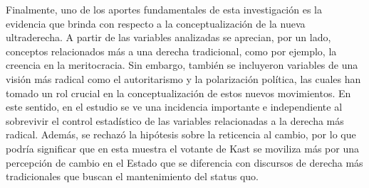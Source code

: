 \documentclass[
  spanish,
  a4paper,
  oneside]{scrbook}
\begin{document}
Finalmente, uno de los aportes fundamentales de esta investigación es la
evidencia que brinda con respecto a la conceptualización de la nueva
ultraderecha. A partir de las variables analizadas se aprecian, por un
lado, conceptos relacionados más a una derecha tradicional, como por
ejemplo, la creencia en la meritocracia. Sin embargo, también se
incluyeron variables de una visión más radical como el autoritarismo y
la polarización política, las cuales han tomado un rol crucial en la
conceptualización de estos nuevos movimientos. En este sentido, en el
estudio se ve una incidencia importante e independiente al sobrevivir el
control estadístico de las variables relacionadas a la derecha más
radical. Además, se rechazó la hipótesis sobre la reticencia al cambio,
por lo que podría significar que en esta muestra el votante de Kast se
moviliza más por una percepción de cambio en el Estado que se diferencia
con discursos de derecha más tradicionales que buscan el mantenimiento
del status quo.
\end{document}
